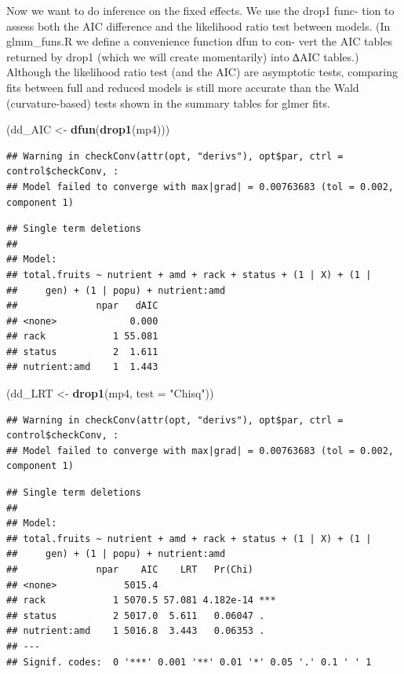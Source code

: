 \documentclass[
  12pt,
]{book}
\newenvironment{Shaded}{\begin{snugshade}}{\end{snugshade}}
\newcommand{\DataTypeTok}[1]{\textcolor[rgb]{0.13,0.29,0.53}{#1}}
\newcommand{\KeywordTok}[1]{\textcolor[rgb]{0.13,0.29,0.53}{\textbf{#1}}}
\newcommand{\NormalTok}[1]{#1}
\newcommand{\StringTok}[1]{\textcolor[rgb]{0.31,0.60,0.02}{#1}}
\begin{document}
Now we want to do inference on the fixed effects. We use the drop1 func- tion to assess both the AIC difference and the likelihood ratio test between models. (In glmm\_funs.R we define a convenience function dfun to con- vert the AIC tables returned by drop1 (which we will create momentarily) into ∆AIC tables.) Although the likelihood ratio test (and the AIC) are asymptotic tests, comparing fits between full and reduced models is still more accurate than the Wald (curvature-based) tests shown in the summary tables for glmer fits.

\begin{Shaded}
\begin{Highlighting}[]
\NormalTok{(dd_AIC <-}\StringTok{ }\KeywordTok{dfun}\NormalTok{(}\KeywordTok{drop1}\NormalTok{(mp4)))}
\end{Highlighting}
\end{Shaded}

\begin{verbatim}
## Warning in checkConv(attr(opt, "derivs"), opt$par, ctrl = control$checkConv, :
## Model failed to converge with max|grad| = 0.00763683 (tol = 0.002, component 1)
\end{verbatim}

\begin{verbatim}
## Single term deletions
## 
## Model:
## total.fruits ~ nutrient + amd + rack + status + (1 | X) + (1 | 
##     gen) + (1 | popu) + nutrient:amd
##              npar   dAIC
## <none>             0.000
## rack            1 55.081
## status          2  1.611
## nutrient:amd    1  1.443
\end{verbatim}

\begin{Shaded}
\begin{Highlighting}[]
\NormalTok{(dd_LRT <-}\StringTok{ }\KeywordTok{drop1}\NormalTok{(mp4, }\DataTypeTok{test =} \StringTok{"Chisq"}\NormalTok{))}
\end{Highlighting}
\end{Shaded}

\begin{verbatim}
## Warning in checkConv(attr(opt, "derivs"), opt$par, ctrl = control$checkConv, :
## Model failed to converge with max|grad| = 0.00763683 (tol = 0.002, component 1)
\end{verbatim}

\begin{verbatim}
## Single term deletions
## 
## Model:
## total.fruits ~ nutrient + amd + rack + status + (1 | X) + (1 | 
##     gen) + (1 | popu) + nutrient:amd
##              npar    AIC    LRT   Pr(Chi)    
## <none>            5015.4                     
## rack            1 5070.5 57.081 4.182e-14 ***
## status          2 5017.0  5.611   0.06047 .  
## nutrient:amd    1 5016.8  3.443   0.06353 .  
## ---
## Signif. codes:  0 '***' 0.001 '**' 0.01 '*' 0.05 '.' 0.1 ' ' 1
\end{verbatim}
\end{document}
